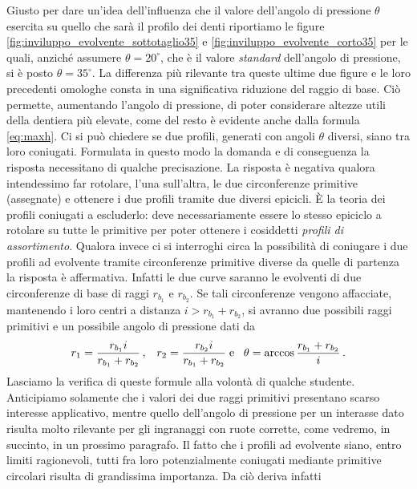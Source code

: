 \noindent Giusto per dare un'idea dell'influenza che il valore dell'angolo
 di pressione $\theta$ esercita su quello che sar\`a il profilo dei denti
 riportiamo le figure \ref{fig:inviluppo_evolvente_sottotaglio35} e 
\ref{fig:inviluppo_evolvente_corto35} per le quali, anzich\'e
assumere $\theta=20^{\circ}$, che \`e il valore {\em standard} dell'angolo di pressione,
si \`e posto $\theta=35^{\circ}$.
La differenza pi\`u rilevante tra queste ultime due figure e le loro precedenti
omologhe consta in una significativa riduzione del raggio di base. Ci\`o
permette, aumentando l'angolo di pressione, di poter considerare
altezze utili della dentiera pi\`u elevate, come del resto \`e evidente
anche dalla formula \ref{eq:maxh}.
Ci si pu\`o chiedere se due profili, generati con angoli $\theta$ diversi,
siano tra loro coniugati. Formulata in questo modo la domanda e di conseguenza
la risposta necessitano di qualche precisazione. La risposta \`e negativa
qualora intendessimo far rotolare,
l'una sull'altra, le due circonferenze primitive (assegnate)
e ottenere i due profili tramite due diversi epicicli.
\`E la teoria dei profili coniugati a escluderlo:
deve necessariamente essere lo stesso epiciclo a rotolare
su tutte le primitive per poter ottenere i cosiddetti {\em profili di assortimento}.
Qualora invece ci si interroghi circa la possibilit\`a di coniugare i due
profili ad evolvente tramite circonferenze primitive diverse da quelle di
partenza la
risposta \`e affermativa. Infatti le due curve saranno le evolventi di 
due circonferenze di base di raggi $r_{b_1}$ e $r_{b_2}$. Se tali circonferenze
vengono affacciate, mantenendo i loro centri a distanza $i>r_{b_1}+r_{b_2}$,
si avranno due possibili raggi primitivi e un possibile angolo di pressione
dati da
\begin{equation}
r_1=\frac{r_{b_1}i}{r_{b_1}+r_{b_2}}\,,\;\;\;
r_2=\frac{r_{b_2}i}{r_{b_1}+r_{b_2}}\; {\rm e}\;\;\;
\theta=\arccos\frac{r_{b_1}+r_{b_2}}{i}\,.
\label{eq:nuove_primitive}
\end{equation}
\noindent Lasciamo la verifica di queste 
formule alla volont\`a di qualche studente.
Anticipiamo solamente che i valori dei due raggi primitivi
presentano scarso interesse applicativo, mentre quello dell'angolo di pressione
per un interasse dato risulta molto rilevante per gli ingranaggi con ruote
corrette, come vedremo, in succinto, in un prossimo paragrafo.
Il fatto che i profili ad evolvente siano, entro limiti ragionevoli,
tutti fra loro potenzialmente coniugati mediante primitive circolari
risulta di grandissima importanza. Da ci\`o deriva infatti
